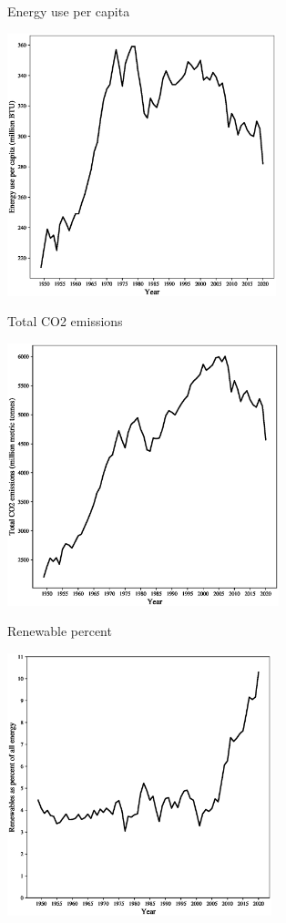 \begin{frame}{Energy use per capita}
\begin{center}
\includegraphics[height=3in]{../Figures/fig-ch10-fig5.eps}
\end{center}
\end{frame}

\begin{frame}{Total CO2 emissions}
\begin{center}
\includegraphics[height=3in]{../Figures/fig-ch10-fig6.eps}
\end{center}
\end{frame}

\begin{frame}{Renewable percent}
\begin{center}
\includegraphics[height=3in]{../Figures/fig-ch10-fig7.eps}
\end{center}
\end{frame}

